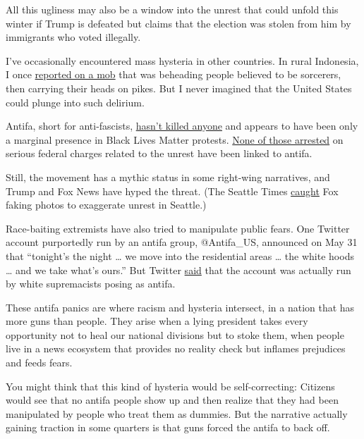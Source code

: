 All this ugliness may also be a window into the unrest that could unfold
this winter if Trump is defeated but claims that the election was stolen
from him by immigrants who voted illegally.

I've occasionally encountered mass hysteria in other countries. In rural
Indonesia, I once
\href{https://www.nytimes.com/1998/10/20/world/fears-of-sorcerers-spur-killings-in-java.html}{reported
on a mob} that was beheading people believed to be sorcerers, then
carrying their heads on pikes. But I never imagined that the United
States could plunge into such delirium.

Antifa, short for anti-fascists,
\href{https://www.wbur.org/hereandnow/2020/06/11/what-is-antifa-trump-protests}{hasn't
killed anyone} and appears to have been only a marginal presence in
Black Lives Matter protests.
\href{https://www.nytimes.com/2020/06/11/us/antifa-protests-george-floyd.html}{None
of those arrested} on serious federal charges related to the unrest have
been linked to antifa.

Still, the movement has a mythic status in some right-wing narratives,
and Trump and Fox News have hyped the threat. (The Seattle Times
\href{https://www.seattletimes.com/seattle-news/politics/fox-news-runs-digitally-altered-images-in-coverage-of-seattles-protests-capitol-hill-autonomous-zone/}{caught}
Fox faking photos to exaggerate unrest in Seattle.)

Race-baiting extremists have also tried to manipulate public fears. One
Twitter account purportedly run by an antifa group, @Antifa\_US,
announced on May 31 that ``tonight's the night \ldots{} we move into the
residential areas \ldots{} the white hoods \ldots{} and we take what's
ours.'' But Twitter
\href{https://www.cbsnews.com/news/twitter-fake-antifa-acount-white-supremacists-removal/}{said}
that the account was actually run by white supremacists posing as
antifa.

These antifa panics are where racism and hysteria intersect, in a nation
that has more guns than people. They arise when a lying president takes
every opportunity not to heal our national divisions but to stoke them,
when people live in a news ecosystem that provides no reality check but
inflames prejudices and feeds fears.

You might think that this kind of hysteria would be self-correcting:
Citizens would see that no antifa people show up and then realize that
they had been manipulated by people who treat them as dummies. But the
narrative actually gaining traction in some quarters is that guns forced
the antifa to back off.

